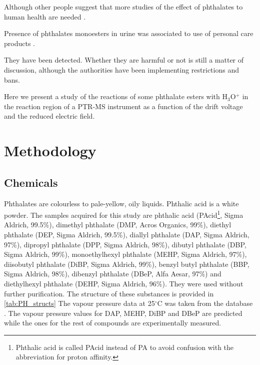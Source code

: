Although other people suggest that more studies of the effect of phthalates to human health are needed \cite{hauser2005phthalates}.

 
 
Presence of phthalates monoesters in urine was associated to use of personal care products \cite{duty2005personal}.

They have been detected. Whether they are harmful or not  is still a matter of discussion, although the authorities have been implementing restrictions and bans.

Here we present a study of the reactions of some phthalate esters with H$_3$O$^+$ in the reaction region of a PTR-MS instrument as a function of the drift voltage and the reduced electric field.




\section{Methodology}

\subsection{Chemicals}
Phthalates are colourless to pale-yellow, oily liquids. Phthalic acid is a white powder.
The samples acquired for this study  are
phthalic acid (PAcid\footnote{Phthalic acid is called PAcid instead of PA to avoid confusion with the abbreviation for proton affinity.}, Sigma Aldrich, 99.5\%),                              %
dimethyl phthalate (DMP, Acros Organics, 99\%),                     %
diethyl phthalate (DEP, Sigma Aldrich, 99.5\%),                     %
diallyl phthalate (DAP, Sigma Aldrich, 97\%),                       %
dipropyl phthalate (DPP, Sigma Aldrich, 98\%),                      %
dibutyl phthalate (DBP, Sigma Aldrich, 99\%),                       %
monoethylhexyl phthalate (MEHP, Sigma Aldrich, 97\%),               %
diisobutyl phthalate (DiBP, Sigma Aldrich, 99\%),                   %
benzyl butyl phthalate (BBP, Sigma Aldrich, 98\%),                  %
dibenzyl phthalate (DBeP, Alfa Aesar, 97\%)                         %
and
diethylhexyl phthalate (DEHP, Sigma Aldrich, 96\%).                 %
They were used without further purification.
%
The structure of these substances is provided in \autoref{tab:PH_structs}
%
The vapour pressure data at 25$^\circ$C was taken from the \citeauthor{USAEPA} database \cite{USAEPA}. The vapour pressure values for DAP, MEHP, DiBP and DBeP are predicted while the ones for the rest of compounds are experimentally measured.

